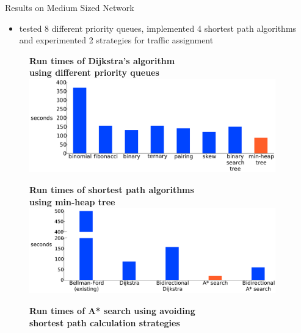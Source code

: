 \documentclass[final]{beamer}
\begin{document}
\begin{frame}{ }
\begin{columns}[t]
\begin{column}{.4\linewidth}
        \end{column}
        \begin{column}{.26\linewidth}
            \begin{block}{Results on Medium Sized Network}
                \begin{itemize}
                    \itemsep.5em
                    \item tested \alert{8 different priority queues}, implemented \alert{4 shortest path algorithms} and experimented \alert{2 strategies} for traffic assignment
                \end{itemize}
                \begin{figure}
                    \centering
                    {\bfseries \qquad Run times of Dijkstra's algorithm\\ \qquad using different priority queues}
                    \includegraphics[width=\linewidth]{img/pq_runtime}
                \end{figure}
                \begin{figure}
                    \centering
                    {\bfseries \qquad Run times of shortest path algorithms\\ using min-heap tree}
                    \includegraphics[width=\linewidth]{img/runtime}
                \end{figure}
                \begin{figure}
                    \centering
                    {\bfseries \qquad Run times of A* search using avoiding\\ \qquad shortest path calculation strategies}

\end{figure}
\end{block}
\end{column}
\end{columns}
\end{frame}
\end{document}

